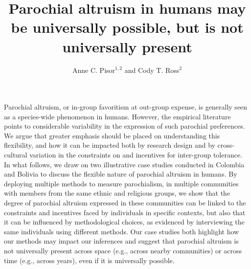 \documentclass[bibauthoryear]{aa}
\begin{document}
 


   \title{Parochial altruism in humans may be universally possible, but is not universally present}

\author{%
Anne C. Pisor$^{1,2}$ and Cody T. Ross$^{2}$
}

   \date{}

 
  \abstract
 {
Parochial altruism, or in-group favoritism at out-group expense, is generally seen as a species-wide phenomenon in humans. However, the empirical literature points to considerable variability in the expression of such parochial preferences. We argue that greater emphasis should be placed on understanding this flexibility, and how it can be impacted both by research design and by cross-cultural variation in the constraints on and incentives for inter-group tolerance. In what follows, we draw on two illustrative case studies conducted in Colombia and Bolivia to discuss the flexible nature of parochial altruism in humans. By deploying multiple methods to measure parochialism, in multiple communities with members from the same ethnic and religious groups, we show that the degree of parochial altruism expressed in these communities can be linked to the constraints and incentives faced by individuals in specific contexts, but also that it can be influenced by methodological choices, as evidenced by interviewing the same individuals using different methods. Our case studies both highlight how our methods may impact our inferences and suggest that parochial altruism is not universally present across space (e.g., across nearby communities) or across time (e.g., across years), even if it is universally possible.
 }

               
               \titlerunning{~}
\authorrunning{~  }%

   \maketitle
%
\end{document}
